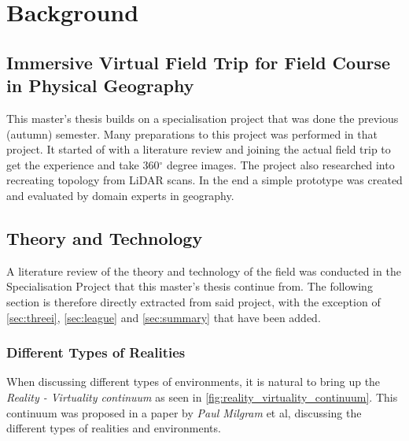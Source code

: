\chapter{Background}
\label{chap:background}


\section{Immersive Virtual Field Trip for Field Course in Physical Geography}
    \label{sec:specialisation}
    This master's thesis builds on a specialisation project \cite{specialisation} that was done the previous (autumn) semester. Many preparations to this project was performed in that project. It started of with a literature review and joining the actual field trip to get the experience and take 360$^\circ$ degree images. The project also researched into recreating topology from LiDAR scans. In the end a simple prototype was created and evaluated by domain experts in geography.

\section{Theory and Technology}
    A literature review of the theory and technology of the field was conducted in the Specialisation Project that this master's thesis continue from. The following section is therefore directly extracted from said project\cite{specialisation}, with the exception of \cref{sec:threei}, \cref{sec:league} and \cref{sec:summary} that have been added.
    
    \subsection{Different Types of Realities}
        When discussing different types of environments, it is natural to bring up the \emph{Reality - Virtuality continuum} \cite{reality_virtuality_continuum} as seen in \cref{fig:reality_virtuality_continuum}. This continuum was proposed in a paper by \emph{Paul Milgram} et al, discussing the different types of realities and environments.
        
